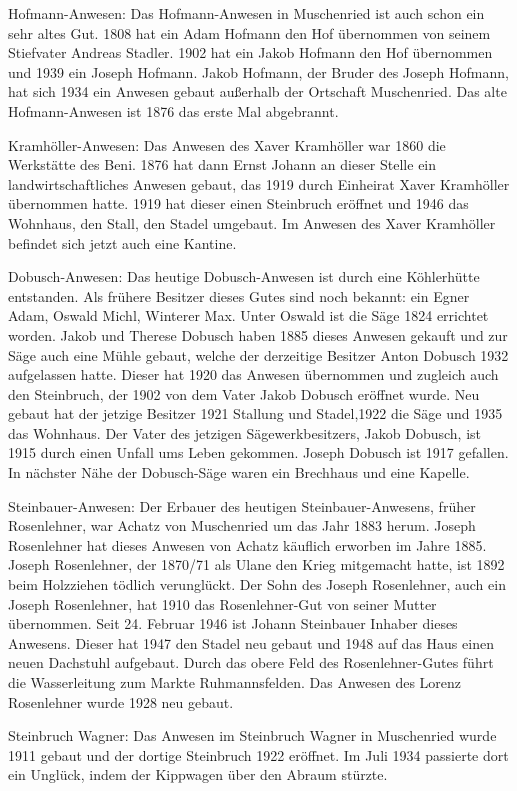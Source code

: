 \documentclass[12pt,a4pager]{book}
\begin{document}
Hofmann-Anwesen: Das Hofmann-Anwesen in Muschenried ist auch schon ein sehr
altes Gut. 1808 hat ein Adam Hofmann den Hof übernommen von seinem Stiefvater
Andreas Stadler. 1902 hat ein Jakob Hofmann den Hof übernommen und 1939 ein
Joseph Hofmann. Jakob Hofmann, der Bruder des Joseph Hofmann, hat sich 1934 ein
Anwesen gebaut außerhalb der Ortschaft Muschenried. Das alte Hofmann-Anwesen ist
1876 das erste Mal abgebrannt.

Kramhöller-Anwesen: Das Anwesen des Xaver Kramhöller war 1860 die Werkstätte des
Beni. 1876 hat dann Ernst Johann an dieser Stelle ein landwirtschaftliches
Anwesen gebaut, das 1919 durch Einheirat Xaver Kramhöller übernommen hatte. 1919
hat dieser einen Steinbruch eröffnet und 1946 das Wohnhaus, den Stall, den
Stadel umgebaut. Im Anwesen des Xaver Kramhöller befindet sich jetzt auch eine
Kantine.

Dobusch-Anwesen: Das heutige Dobusch-Anwesen ist durch eine Köhlerhütte
entstanden. Als frühere Besitzer dieses Gutes sind noch bekannt: ein Egner Adam,
Oswald Michl, Winterer Max. Unter Oswald ist die Säge 1824 errichtet worden.
Jakob und Therese Dobusch haben 1885 dieses Anwesen gekauft und zur Säge auch
eine Mühle gebaut, welche der derzeitige Besitzer Anton Dobusch 1932 aufgelassen
hatte. Dieser hat 1920 das Anwesen übernommen und zugleich auch den Steinbruch,
der 1902 von dem Vater Jakob Dobusch eröffnet wurde. Neu gebaut hat der jetzige
Besitzer 1921 Stallung und Stadel,1922 die Säge und 1935 das Wohnhaus. Der Vater
des jetzigen Sägewerkbesitzers, Jakob Dobusch, ist 1915 durch einen Unfall ums
Leben gekommen. Joseph Dobusch ist 1917 gefallen. In nächster Nähe der
Dobusch-Säge waren ein Brechhaus und eine Kapelle.

Steinbauer-Anwesen: Der Erbauer des heutigen Steinbauer-Anwesens, früher
Rosenlehner, war Achatz von Muschenried um das Jahr 1883 herum. Joseph
Rosenlehner hat dieses Anwesen von Achatz käuflich erworben im Jahre 1885.
Joseph Rosenlehner, der 1870/71 als Ulane den Krieg mitgemacht hatte, ist 1892
beim Holzziehen tödlich verunglückt. Der Sohn des Joseph Rosenlehner, auch ein
Joseph Rosenlehner, hat 1910 das Rosenlehner-Gut von seiner Mutter übernommen.
Seit 24. Februar 1946 ist Johann Steinbauer Inhaber dieses Anwesens. Dieser hat
1947 den Stadel neu gebaut und 1948 auf das Haus einen neuen Dachstuhl
aufgebaut. Durch das obere Feld des Rosenlehner-Gutes führt die Wasserleitung
zum Markte Ruhmannsfelden. Das Anwesen des Lorenz Rosenlehner wurde 1928 neu
gebaut.

Steinbruch Wagner: Das Anwesen im Steinbruch Wagner in Muschenried wurde 1911
gebaut und der dortige Steinbruch 1922 eröffnet. Im Juli 1934 passierte dort ein
Unglück, indem der Kippwagen über den Abraum stürzte.
\end{document}
